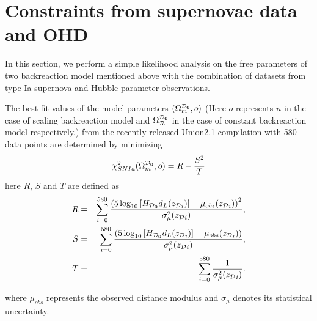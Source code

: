 \documentclass[preprint,preprintnumbers, prd, floatfix,  superscriptaddress,nofootinbib] {revtex4-1}
\newcommand{\CD}{{\cal D}}
\newcommand{\CR}{{\cal R}}
\newcommand{\now}[1]{{#1_{\rm \bf 0}}}
\begin{document}
\section{Constraints from supernovae data and OHD}
\label{sec:3}
In this section, we perform a simple likelihood analysis on the free parameters of two backreaction model mentioned above with the combination of datasets from type Ia supernova and Hubble parameter observations.

The best-fit values of the model parameters $(\Omega_{m}^{\now\CD},o)$ (Here $o$ represents $n$ in the case of scaling backreaction model and $\Omega_{\CR}^{\now\CD}$ in the case of constant backreaction model respectively.) from the recently released Union2.1\cite{Suzuki2012The} compilation with 580 data points are determined by minimizing
\begin{equation}\label{}
  \chi_{SN Ia}^{2}(\Omega_{m}^{\now\CD},o)= R-\frac{S^{2}}{T}
\end{equation}
here $R$, $S$ and $T$ are defined as
\begin{eqnarray}
  R &=& \sum_{i=0}^{580}\frac{\left(5\log_{10}\left[H_{\now\CD}d_{L}({z_{\CD}}_{i})\right]-\mu_{obs}({z_{\CD}}_{i})\right)^{2}}{\sigma_{\mu}^{2}({z_{\CD}}_{i})},\\
  S &=& \sum_{i=0}^{580}\frac{\left(5\log_{10}\left[H_{\now\CD}d_{L}({z_{\CD}}_{i})\right]-\mu_{obs}({z_{\CD}}_{i})\right)}{\sigma_{\mu}^{2}({z_{\CD}}_{i})}, \\
  T &=& \sum_{i=0}^{580}\frac{1}{\sigma_{\mu}^{2}({z_{\CD}}_{i})}.
\end{eqnarray}

where $\mu_{obs}$ represents the observed distance modulus and $\sigma_{\mu}$ denotes its statistical uncertainty.
\end{document}
